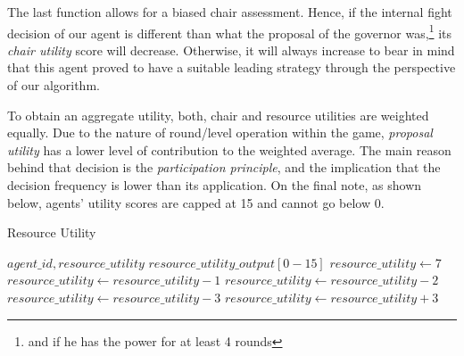 The last function allows for a biased chair assessment. Hence, if the internal fight decision of our agent is different than what the proposal of the governor was,\footnote{and if he has the power for at least 4 rounds} its \textit{chair utility }score will decrease. Otherwise, it will always increase to bear in mind that this agent proved to have a suitable leading strategy through the perspective of our algorithm.

To obtain an aggregate utility, both, chair and resource utilities are weighted equally. Due to the nature of round/level operation within the game, \textit{proposal utility} has a lower level of contribution to the weighted average. The main reason behind that decision is the \textit{participation principle}, and the implication that the decision frequency is lower than its application. On the final note, as shown below, agents' utility scores are capped at 15 and cannot go below 0.                    




\begin{algorithm}[htb]
\caption{Resource Utility}\label{alg:1}
\begin{algorithmic} 
\scriptsize
\Require $agent\_id, resource\_utility$
\Ensure $resource\_utility\_output[0-15]$
\State $resource\_utility \leftarrow 7$
\EndIf
{}
\State $resource\_utility \leftarrow resource\_utility-1$
\EndIf
{}
\State $resource\_utility \leftarrow resource\_utility-2$
\Else
\State $resource\_utility \leftarrow resource\_utility-3$
\EndIf
\EndIf
{}
\State $resource\_utility \leftarrow resource\_utility+3$
\EndIf
\end{algorithmic}
\end{algorithm}



